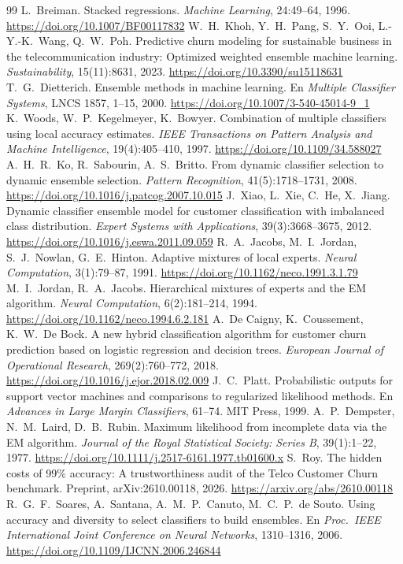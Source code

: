 \documentclass[11pt,a4paper]{article}
\newcommand{\doi}[1]{\url{https://doi.org/#1}}
\begin{document}
\begin{thebibliography}{99}
 L.~Breiman. Stacked regressions. \emph{Machine Learning}, 24:49--64, 1996. \doi{10.1007/BF00117832}
 W.~H.~Khoh, Y.~H.~Pang, S.~Y.~Ooi, L.-Y.-K.~Wang, Q.~W.~Poh. Predictive churn modeling for sustainable business in the telecommunication industry: Optimized weighted ensemble machine learning. \emph{Sustainability}, 15(11):8631, 2023. \doi{10.3390/su15118631}
 T.~G.~Dietterich. Ensemble methods in machine learning. En \emph{Multiple Classifier Systems}, LNCS 1857, 1--15, 2000. \doi{10.1007/3-540-45014-9_1}
 K.~Woods, W.~P.~Kegelmeyer, K.~Bowyer. Combination of multiple classifiers using local accuracy estimates. \emph{IEEE Transactions on Pattern Analysis and Machine Intelligence}, 19(4):405--410, 1997. \doi{10.1109/34.588027}
 A.~H.~R.~Ko, R.~Sabourin, A.~S.~Britto. From dynamic classifier selection to dynamic ensemble selection. \emph{Pattern Recognition}, 41(5):1718--1731, 2008. \doi{10.1016/j.patcog.2007.10.015}
 J.~Xiao, L.~Xie, C.~He, X.~Jiang. Dynamic classifier ensemble model for customer classification with imbalanced class distribution. \emph{Expert Systems with Applications}, 39(3):3668--3675, 2012. \doi{10.1016/j.eswa.2011.09.059}
 R.~A.~Jacobs, M.~I.~Jordan, S.~J.~Nowlan, G.~E.~Hinton. Adaptive mixtures of local experts. \emph{Neural Computation}, 3(1):79--87, 1991. \doi{10.1162/neco.1991.3.1.79}
 M.~I.~Jordan, R.~A.~Jacobs. Hierarchical mixtures of experts and the EM algorithm. \emph{Neural Computation}, 6(2):181--214, 1994. \doi{10.1162/neco.1994.6.2.181}
 A.~De Caigny, K.~Coussement, K.~W.~De Bock. A new hybrid classification algorithm for customer churn prediction based on logistic regression and decision trees. \emph{European Journal of Operational Research}, 269(2):760--772, 2018. \doi{10.1016/j.ejor.2018.02.009}
 J.~C.~Platt. Probabilistic outputs for support vector machines and comparisons to regularized likelihood methods. En \emph{Advances in Large Margin Classifiers}, 61--74. MIT Press, 1999.
 A.~P.~Dempster, N.~M.~Laird, D.~B.~Rubin. Maximum likelihood from incomplete data via the EM algorithm. \emph{Journal of the Royal Statistical Society: Series B}, 39(1):1--22, 1977. \doi{10.1111/j.2517-6161.1977.tb01600.x}
 S.~Roy. The hidden costs of 99\% accuracy: A trustworthiness audit of the Telco Customer Churn benchmark. Preprint, arXiv:2610.00118, 2026. \url{https://arxiv.org/abs/2610.00118}
 R.~G.~F.~Soares, A.~Santana, A.~M.~P.~Canuto, M.~C.~P.~de Souto. Using accuracy and diversity to select classifiers to build ensembles. En \emph{Proc.\ IEEE International Joint Conference on Neural Networks}, 1310--1316, 2006. \doi{10.1109/IJCNN.2006.246844}

\end{thebibliography}
\end{document}

